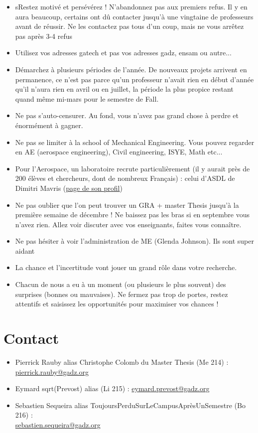 \documentclass{article}
\begin{document}
\begin{itemize}
\item sRestez motivé et persévérez ! N'abandonnez pas aux premiers refus. Il y en aura beaucoup, certains ont dû contacter jusqu'à une vingtaine de professeurs avant de réussir. Ne les contactez pas tous d'un coup, mais ne vous arrêtez pas après 3-4 refus
\item Utilisez vos adresses gatech et pas vos adresses gadz, ensam ou autre... 
\item Démarchez à plusieurs périodes de l'année. De nouveaux projets arrivent en permanence, ce n'est pas parce qu'un professeur n'avait rien en début d'année qu'il n'aura rien en avril ou en juillet, la période la plus propice restant quand même mi-mars pour le semestre de Fall.
\item Ne pas s'auto-censurer. Au fond, vous n'avez pas grand chose à perdre et énormément à gagner.
\item Ne pas se limiter à la school of Mechanical Engineering. Vous pouvez regarder en AE (aerospace engineering), Civil engineering, ISYE, Math etc...
\item Pour l'Aerospace, un laboratoire recrute particulièrement (il y aurait près de 200 élèves et chercheurs, dont de nombreux Français) : celui d'ASDL de Dimitri Mavris (\href{https://ae.gatech.edu/people/dimitri-mavris}{page de son profil})
\item Ne pas oublier que l'on peut trouver un GRA + master Thesis jusqu'à la première semaine de décembre ! Ne baissez pas les bras si en septembre vous n'avez rien. Allez voir discuter avec vos enseignants, faites vous connaître.
\item Ne pas hésiter à voir l'administration de ME (Glenda Johnson). Ils sont super aidant 
\item La chance et l'incertitude vont jouer un grand rôle dans votre recherche. \item Chacun de nous a eu à un moment (ou plusieurs le plus souvent) des surprises (bonnes ou mauvaises). Ne fermez pas trop de portes, restez attentifs et saisissez les opportunités pour maximiser vos chances !

\end{itemize}

\section{Contact}
\begin{itemize}
\item Pierrick Rauby alias Christophe Colomb du Master Thesis (Me 214) : \href{mailto:pierrick.rauby@gadz.org}{pierrick.rauby@gadz.org}
\item Eymard sqrt(Prevost) alias (Li 215) : \href{mailto:eymard.prevost@gadz.org }{eymard.prevost@gadz.org}
\item Sebastien Sequeira alias ToujoursPerduSurLeCampusAprèsUnSemestre  (Bo 216) :\\ \href{mailto:sebastien.sequeira@gadz.org }{sebastien.sequeira@gadz.org} 
\end{itemize}
\end{document}
